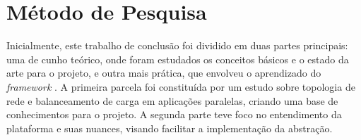 
 


\section{Método de Pesquisa}
\label{sec:metodologia}

 
Inicialmente, este trabalho de conclusão foi dividido em duas partes principais: uma de cunho teórico, onde foram estudados os conceitos básicos e o estado da arte para o projeto, e outra mais prática, que envolveu o aprendizado do \textit{framework} \charm. 
A primeira parcela foi constituída por um estudo sobre topologia de rede e balanceamento de carga em aplicações paralelas, criando uma base de conhecimentos para o projeto. 
A segunda parte teve foco no entendimento da plataforma e suas nuances, visando facilitar a implementação da abstração.

